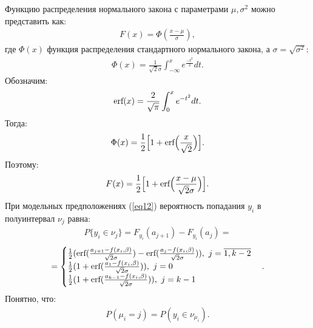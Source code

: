 \documentclass[a4paper,14pt]{extarticle}
\begin{document}
Функцию распределения нормального закона с параметрами $\mu,\sigma^2$ можно представить как:
\begin{eqnarray}
    F(x)=\Phi(\frac{x-\mu}{\sigma}),
\end{eqnarray}
где $\Phi(x)$ функция распределения стандартного нормального закона, а $\sigma = \sqrt{\sigma^2}$:
\begin{eqnarray}
    \Phi(x)=\frac{1}{\sqrt{2}\sigma}\int_{-\infty}^{x}e^{\frac{-t^2}{2}}dt.
\end{eqnarray}
Обозначим:
\begin{eqnarray}
    \textup{erf}(x)=\frac{2}{\sqrt{\pi}}\int_0^{x}e^{-t^2}dt.
\end{eqnarray}
Тогда:
\begin{eqnarray}
    \Phi(x)= \frac{1}{2} \Big[1+\textup{erf}\Big(\frac{x}{\sqrt{2}} \Big) \Big].
\end{eqnarray}
Поэтому:
\begin{eqnarray}
    F(x)= \frac{1}{2} \Big[1+\textup{erf}\Big(\frac{x-\mu}{\sqrt{2}\sigma} \Big) \Big].
\end{eqnarray}
При модельных предположениях (\ref{eq12}) вероятность попадания $y_i$ в полуинтервал $\nu_j$ равна:
\begin{eqnarray}
    P\{y_i\in\nu_j\}= F_{y_i}(a_{j+1})-F_{y_i}(a_{j})=
\end{eqnarray}
\begin{eqnarray*}
    =
    \begin{cases}
        \frac{1}{2}(\textup{erf}(\frac{a_{j+1}-f(x_i,\beta)}{\sqrt{2}\sigma})-\textup{erf}(\frac{a_{j}-f(x_i,\beta)}{\sqrt{2}\sigma})),~j=\overline{1,k-2}\\
        \frac{1}{2}(1+\textup{erf}(\frac{a_{1}-f(x_i,\beta)}{\sqrt{2}\sigma})),~j=0\\
        \frac{1}{2}(1+\textup{erf}(\frac{a_{k-1}-f(x_i,\beta)}{\sqrt{2}\sigma})),~j=k-1
    \end{cases}.
\end{eqnarray*}
Понятно, что:
\begin{eqnarray}
    P(\mu_i=j)=P(y_i\in \nu_{\mu_i}).
\end{eqnarray}
\end{document}
